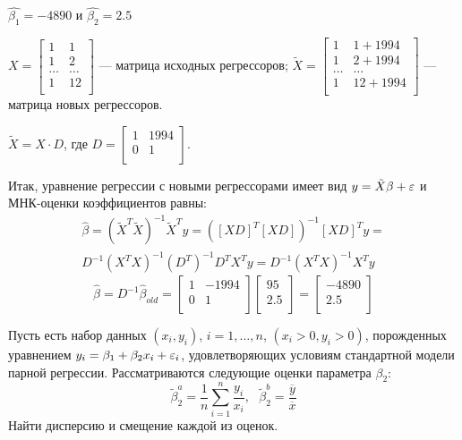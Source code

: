 \documentclass[pdftex,11pt,openany]{book}
\begin{document}
\begin{solution}
$\hat{\beta_1} = -4890$ и $\hat{\beta_2} = 2.5$

$X = \begin{bmatrix}
1 & 1 \\
1 & 2 \\
\ldots & \ldots \\
1 & 12 \\
\end{bmatrix}$ --- матрица исходных регрессоров; $\tilde{X} = \begin{bmatrix}
1 & 1+1994\\
1 & 2+1994 \\
\ldots & \ldots \\
1 & 12+1994 \\
\end{bmatrix}$ --- матрица новых регрессоров.

$\tilde{X} = X \cdot D$, где $D = \begin{bmatrix}
1 & 1994 \\
0 & 1 \\
\end{bmatrix}$.

Итак, уравнение регрессии с новыми регрессорами имеет вид $y = \tilde{X}\beta + \varepsilon$ и МНК-оценки коэффициентов равны:
\begin{multline}
\hat{\beta} = \left( \tilde{X}^T \tilde{X} \right)^{-1} \tilde{X}^T y = \left( [XD]^T [XD] \right)^{-1} [XD]^T y = \\
D^{-1} (X^T X)^{-1} (D^T)^{-1} D^T X^T y = D^{-1} (X^T X)^{-1}X^T y 
\end{multline}
\[
\hat{\beta} = D^{-1}\hat{\beta}_{old} = \begin{bmatrix}
1 & -1994 \\
0 & 1 \\
\end{bmatrix} \begin{bmatrix}
95 \\
2.5 \\
\end{bmatrix} = \begin{bmatrix}
-4890 \\
2.5 \\
\end{bmatrix}
\]
\end{solution}

\begin{problem}
Пусть есть набор данных $(x_i, y_i)$, $i = 1, \ldots, n$, $(x_i>0, y_i>0)$, порожденных уравнением $y_i = \beta_1 + \beta_2 x_i + \varepsilon_i$, удовлетворяющих условиям стандартной модели парной регрессии.
Рассматриваются следующие оценки параметра $\beta_2$:
$$\tilde{\beta}_2^a = \frac{1}{n}\sum_{i=1}^n \frac{y_i}{x_i}, \text{ } \tilde{\beta}_2^b = \frac{\overline{y}}{\overline{x}}$$
Найти дисперсию и смещение каждой из оценок.
\end{problem}
\end{document}
